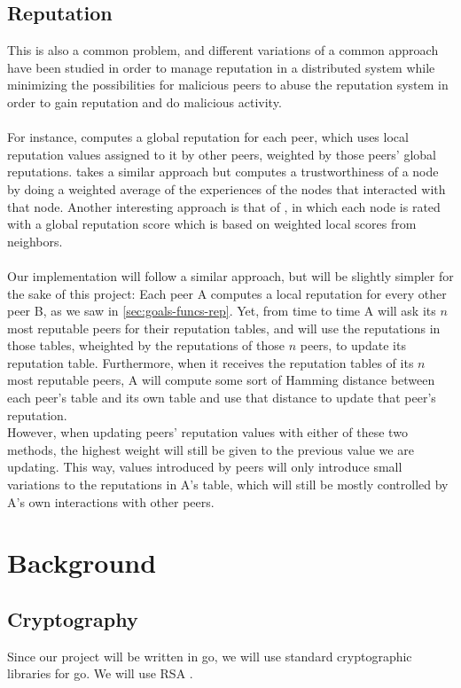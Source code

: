 \documentclass[]{article}
\begin{document}
\subsection{Reputation}
This is also a common problem, and different variations of a common approach have been studied in order to manage reputation in a distributed system while minimizing the possibilities for malicious peers to abuse the reputation system in order to gain reputation and do malicious activity.
\\\\
For instance, \cite{gupta2003reputation} computes a global reputation for each peer, which uses local reputation values assigned to it by other peers, weighted by those peers' global reputations.
\cite{despotovic2006p2p} takes a similar approach but computes a trustworthiness of a node by doing a weighted average of the experiences of the nodes that interacted with that node.
Another interesting approach is that of \cite{zhou2007powertrust}, in which each node is rated with a global reputation score which is based on weighted local scores from neighbors.
\\\\
Our implementation will follow a similar approach, but will be slightly simpler for the sake of this project:
Each peer A computes a local reputation for every other peer B, as we saw in \ref{sec:goals-funcs-rep}.
Yet, from time to time A will ask its $n$ most reputable peers for their reputation tables, and will use the reputations in those tables, wheighted by the reputations of those $n$ peers, to update its reputation table.
Furthermore, when it receives the reputation tables of its $n$ most reputable peers, A will compute some sort of Hamming distance between each peer's table and its own table and use that distance to update that peer's reputation.
\\
However, when updating peers' reputation values with either of these two methods, the highest weight will still be given to the previous value we are updating.
This way, values introduced by peers will only introduce small variations to the reputations in A's table, which will still be mostly controlled by A's own interactions with other peers.

\section{Background}
\label{sec:background}

\subsection{Cryptography}
Since our project will be written in go, we will use standard cryptographic libraries for go. We will use RSA \cite{RFC8017}.
\end{document}
